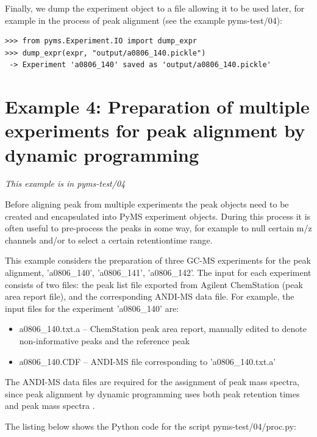 Finally, we dump the experiment object to a file allowing it to be used
later, for example in the process of peak alignment (see the example
pyms-test/04):

\begin{verbatim}
>>> from pyms.Experiment.IO import dump_expr
>>> dump_expr(expr, "output/a0806_140.pickle")
 -> Experiment 'a0806_140' saved as 'output/a0806_140.pickle'
\end{verbatim}

\section{Example 4: Preparation of multiple experiments for peak alignment
by dynamic programming}

\noindent
{\em This example is in pyms-test/04}

Before aligning peak from multiple experiments the peak objects need to be
created and encapsulated into PyMS experiment objects. During this process
it is often useful to pre-process the peaks in some way, for example to
null certain m/z channels and/or to select a certain retentiontime range.

This example considers the preparation of three GC-MS experiments for
the peak alignment, 'a0806\_140', 'a0806\_141', 'a0806\_142'. The input
for each experiment consists of two files: the peak list file exported
from Agilent ChemStation (peak area report file), and the corresponding
ANDI-MS data file. For example, the input files for the experiment
'a0806\_140' are:

\begin{itemize}
\item a0806\_140.txt.a -- ChemStation peak area report, manually edited
to denote non-informative peaks and the reference peak
\item a0806\_140.CDF -- ANDI-MS file corresponding to 'a0806\_140.txt.a'
\end{itemize}

The ANDI-MS data files are required for the assignment of peak mass spectra,
since peak alignment by dynamic programming uses both peak retention times
and peak mass spectra \cite{Robinson07}.

The listing below shows the Python code for the script pyms-test/04/proc.py:

